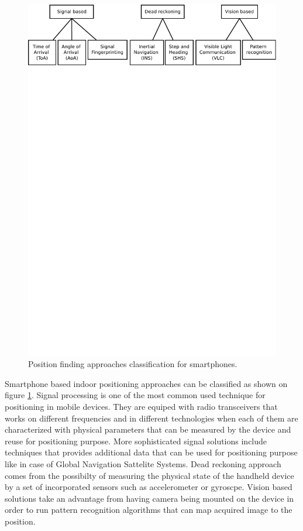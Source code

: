 \documentclass[../main.tex]{subfiles}
\begin{document}
\begin{figure}[ht]
\includegraphics[width=\textwidth, trim={0 23cm 0 0},clip]{pictures/smartphone_localization_approaches.pdf}
\centering
\caption{Position finding approaches classification for smartphones.\cite{inertial_navi_velocity_model}}
\label{fig:smartphone_localization_approaches}
\end{figure}

Smartphone based indoor positioning approaches can be classified as shown on figure \ref{fig:smartphone_localization_approaches}. Signal processing is one of the most common used technique for positioning in mobile devices. They are equiped with radio transceivers that works on different frequencies and in different technologies when each of them are characterized with physical parameters that can be measured by the device and reuse for positioning purpose. More sophisticated signal solutions include techniques that provides additional data that can be used for positioning purpose like in case of Global Navigation Sattelite Systems. Dead reckoning approach comes from the possibilty of measuring the physical state of the handheld device by a set of incorporated sensors such as accelerometer or gyroscpe. Vision based solutions take an advantage from having camera being mounted on the device in order to run pattern recognition algorithms that can map acquired image to the position.
\end{document}
